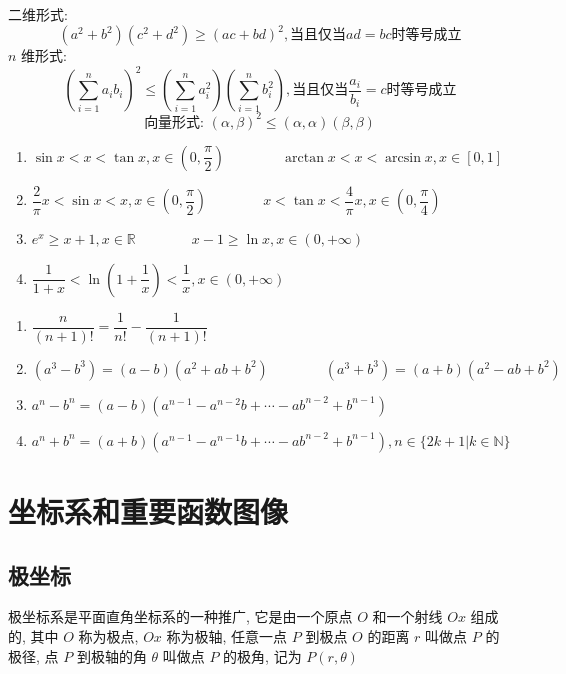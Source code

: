 \begin{theorem}[柯西不等式]
	二维形式:
	$$(a^{2}+b^{2})(c^{2}+d^{2})\geq (ac+bd)^{2}, \text{当且仅当} ad =bc \text{时等号成立}$$
	$n$ 维形式:
	$$\left(\sum_{i=1}^{n}a_{i}b_{i}\right)^{2}\leq \left(\sum_{i=1}^{n}a_{i}^{2}\right)\left(\sum_{i=1}^{n}b_{i}^{2}\right),\text{当且仅当} \dfrac{a_{i}}{b_{i}}=c\text{时等号成立}$$
	$$\text{向量形式: } (\alpha,\beta)^{2}\leq (\alpha,\alpha)(\beta,\beta)$$
\end{theorem}
\begin{theorem}[重要不等式]
	\begin{enumerate}
		\item $\sin x < x < \tan x, x\in (0,\dfrac{\pi}{2})\qquad \qquad \arctan x < x < \arcsin x, x\in[0,1]$
		\item $\dfrac{2}{\pi}x < \sin x < x, x\in(0,\dfrac{\pi}{2})\qquad \qquad x < \tan x < \dfrac{4}{\pi}x , x\in(0,\dfrac{\pi}{4})$
		\item $e^{x} \geq x + 1,x\in\mathbb{R}\qquad \qquad x-1 \geq \ln x, x\in(0,+\infty)$
		\item $\dfrac{1}{1+x} < \ln (1+\dfrac{1}{x}) < \dfrac{1}{x}, x\in(0,+\infty)$
	\end{enumerate}
\end{theorem}

\begin{theorem}[重要公式]
	\begin{enumerate}
		\item $\dfrac{n}{(n+1)!} = \dfrac{1}{n!} - \dfrac{1}{(n+1)!}$
		\item $(a^{3}-b^{3}) = (a-b)(a^{2}+ab+b^{2})\qquad\qquad (a^{3}+b^{3}) = (a+b)(a^{2}-ab+b^{2})$
		\item $a^{n} - b^{n} = (a-b)(a^{n-1}-a^{n-2}b+\cdots -ab^{n-2}+b^{n-1})$
		\item $a^{n} + b^{n} = (a+b)(a^{n-1}-a^{n-1}b+\cdots -ab^{n-2} +b^{n-1}), n\in \{2k+1 | k\in \mathbb{N}\}$
	\end{enumerate}
\end{theorem}

\section{坐标系和重要函数图像}
\subsection{极坐标}
\begin{definition}[极坐标]
	极坐标系是平面直角坐标系的一种推广, 它是由一个原点 $O$ 和一个射线 $Ox$ 组成的, 其中 $O$ 称为极点, $Ox$ 称为极轴, 任意一点 $P$ 到极点 $O$ 的距离 $r$ 叫做点 $P$ 的极径, 点 $P$ 到极轴的角 $\theta$ 叫做点 $P$ 的极角, 记为 $P(r,\theta)$
\end{definition}


